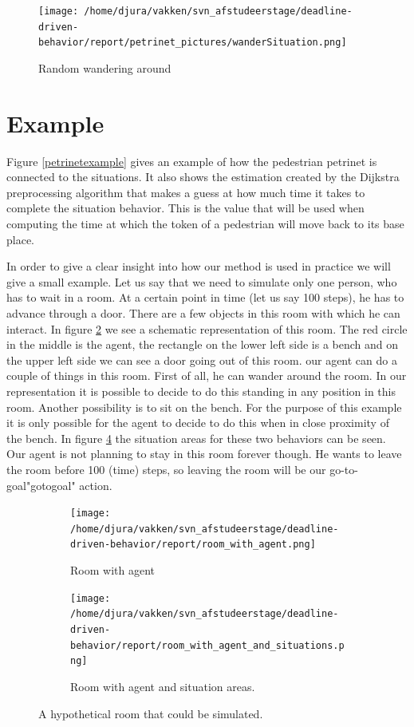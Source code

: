 \documentclass[11pt]{book}
\begin{document}
\begin{figure}[h!]
\centering            
\texttt{[image: /home/djura/vakken/svn\_afstudeerstage/deadline-driven-behavior/report/petrinet\_pictures/wanderSituation.png]}
\caption{Random wandering around}
\label{fig:wanderpetrinet}
\end{figure}
\clearpage

\section{Example}
Figure \ref{petrinetexample} gives an example of how the pedestrian petrinet is connected to the situations. It also shows the estimation created by the Dijkstra preprocessing algorithm that makes a guess at how much time it takes to complete the situation behavior. This is the value that will be used when computing the time at which the token of a pedestrian will move back to its base place.

In order to give a clear insight into how our method is used in practice we will give a small example. Let us say that we need to simulate only one person, who has to wait in a room. At a certain point in time (let us say 100 steps), he has to advance through a door. There are a few objects in this room with which he can interact. In figure  \ref{fig:roomwithagent} we see a schematic representation of this room. The red circle in the middle is the agent, the rectangle on the lower left side is a bench and on the upper left side we can see a door going out of this room. our agent can do a couple of things in this room. First of all, he can wander around the room. In our representation it is possible to decide to do this standing in any position in this room. Another possibility is to sit on the bench. For the purpose of this example it is only possible for the agent to decide to do this when in close proximity of the bench. In figure \ref{fig:roomwithagentsituations} the situation areas for these two behaviors can be seen. Our agent is not planning to stay in this room forever though. He wants to leave the room before 100 (time) steps, so leaving the room will be our go-to-goal"gotogoal" action.

\begin{figure}
\centering
\begin{subfigure}[b]{0.5\textwidth}
\centering
\texttt{[image: /home/djura/vakken/svn\_afstudeerstage/deadline-driven-behavior/report/room\_with\_agent.png]}
\caption{Room with agent}
\label{fig:roomwithagent}
\end{subfigure}%
\begin{subfigure}[b]{0.5\textwidth}
\centering            
\texttt{[image: /home/djura/vakken/svn\_afstudeerstage/deadline-driven-behavior/report/room\_with\_agent\_and\_situations.png]}
\caption{Room with agent and situation areas.}
\label{fig:roomwithagentsituations}
\end{subfigure}
\caption{A hypothetical room that could be simulated.}
\end{figure}
\end{document}
